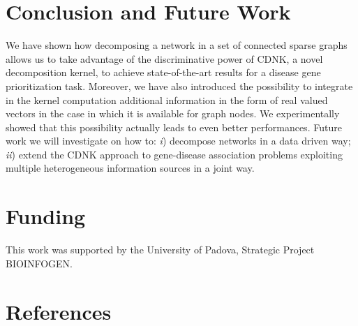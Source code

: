 \documentclass[review]{elsarticle}
\begin{document}
\section{Conclusion and Future Work}
We have shown how decomposing a network in a set of connected sparse graphs allows us to take advantage of the discriminative power of CDNK, a novel decomposition kernel, to achieve state-of-the-art results for a disease gene prioritization task.
Moreover, we have also introduced the possibility to integrate in the kernel computation  additional information in the form of real valued vectors in the case in which it is available for graph nodes. We experimentally showed that this possibility actually leads to even better performances. Future work we will investigate on how to: \textit{i}) decompose networks in a data driven way; \textit{ii}) extend the CDNK approach to gene-disease association problems exploiting multiple heterogeneous information sources in a joint way.


\section*{Funding}
This work was supported by the University of Padova, Strategic Project BIOINFOGEN.
\section*{References}


\end{document}
